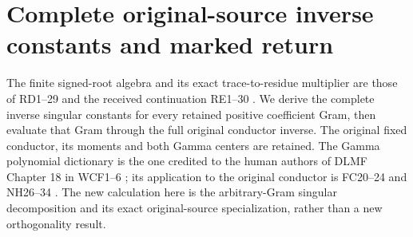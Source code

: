 \documentclass[11pt]{article}
\begin{document}
\section{Complete original-source inverse constants and marked return}


The finite signed-root algebra and its exact trace-to-residue
multiplier are those of RD1--29 and the received continuation
RE1--30 \cite{Fable037,ReceivedRE}. We derive the complete inverse singular
constants for every retained positive coefficient Gram, then
evaluate that Gram through the full original conductor inverse.
The original fixed conductor, its moments and both Gamma centers
are retained. The Gamma polynomial dictionary is the one credited
to the human authors of DLMF Chapter 18 in WCF1--6
\cite{WCF,DLMF18Source}; its application to the original conductor is
FC20--24 and NH26--34 \cite{Fable037}. The new calculation here is the
arbitrary-Gram singular decomposition and its exact original-source
specialization, rather than a new orthogonality result.
\end{document}
